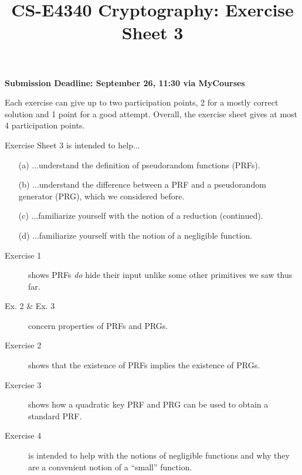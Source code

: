 \documentclass[envcountsame,runningheads,notitlepage]{../llncs}
\title{CS-E4340 Cryptography: Exercise Sheet 3}
\author{}\institute{}
\theoremstyle{definition}
\begin{document}


\maketitle

\noindent
\textbf{Submission Deadline: September 26, 11:30 via MyCourses}

\medskip
\noindent
Each exercise can give up to two participation points, 2 for a mostly correct solution and 1 point for a good attempt. Overall, the exercise sheet gives at most 4 participation points.

\medskip
\noindent
Exercise Sheet 3 is intended to help...
\begin{itemize}
\item[(a)] ...understand the definition of pseudorandom functions (PRFs).
\item[(b)] ...understand the difference between a PRF and a pseudorandom generator (PRG), which we considered before.
\item[(c)] ...familiarize yourself with the notion of a reduction (continued).
\item[(d)] ...familiarize yourself with the notion of a negligible function.
\end{itemize}





\begin{description}
\item[Exercise 1] shows PRFs \textit{do} hide their input unlike some other primitives we saw thus far.
\item[Ex. 2 \& Ex. 3] concern properties of PRFs and PRGs.
\item[Exercise 2] shows that the existence of PRFs implies the existence of PRGs.
\item[Exercise 3] shows how a quadratic key PRF and PRG can be used to obtain a standard PRF.
\item[Exercise 4] is intended to help with the notions of negligible functions and why they are a convenient notion of a ``small'' function.
\end{description}
\end{document}
